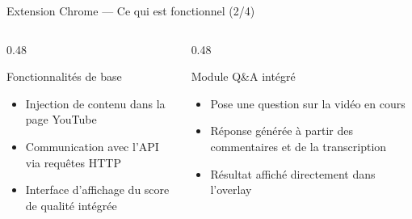\documentclass[aspectratio=169, 12pt]{beamer}
\begin{document}
\begin{frame}{Extension Chrome — Ce qui est fonctionnel (2/4)}

  \begin{columns}[T]
    \begin{column}{0.48\textwidth}
      \begin{block}{Fonctionnalités de base}
        \begin{itemize}
          \item Injection de contenu dans la page YouTube
          \item Communication avec l'API via requêtes HTTP
          \item Interface d'affichage du score de qualité intégrée
        \end{itemize}
      \end{block}
    \end{column}
    \begin{column}{0.48\textwidth}
      \begin{exampleblock}{Module Q\&A intégré}
        \small
        \begin{itemize}
          \item Pose une question sur la vidéo en cours
          \item Réponse générée à partir des commentaires et de la transcription
          \item Résultat affiché directement dans l'overlay
        \end{itemize}
      \end{exampleblock}
    \end{column}
  \end{columns}

\end{frame}
\end{document}
